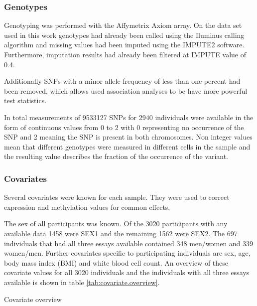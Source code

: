\documentclass[a4paper,12pt]{article}
\begin{document}
 
\subsubsection{Genotypes}
Genotyping was performed with the Affymetrix Axiom array. On the data set used in this work genotypes had already been called using the Iluminus calling algorithm and missing values had been imputed using the IMPUTE2 software\cite{10.1371/journal.pgen.1000529}. Furthermore, imputation results had already been filtered at IMPUTE value of 0.4.  

Additionally SNPs with a minor allele frequency of less than one percent had been removed, which allows used association analyses to be have more powerful test statistics.

In total measurements of 9533127 SNPs for 2940 individuals were available in the form of continuous values from 0 to 2 with 0 representing no occurrence of the SNP and 2 meaning the SNP is present in both chromosomes. Non integer values mean that different genotypes were measured in different cells in the sample and the resulting value describes the fraction of the occurrence of the variant. 

\subsubsection{Covariates}
Several covariates were known for each sample. They were used to correct expression and methylation values for common effects. 

The sex of all participants was known. Of the 3020 participants with any available data 1458 were SEX1 and the remaining 1562 were SEX2. The 697 individuals that had all three essays available contained 348 men/women and 339 women/men.
Further covariates specific to participating individuals are sex, age, body mass index (BMI) and white blood cell count. An overview of these covariate values for all 3020 individuals and the individuals with all three essays available is shown in table \ref{tab:covariate.overview}.


\begin{table}[h!]
  	\begin{minipage}{.45\textwidth}
    \end{minipage}
    \hfill
     \begin{minipage}{.45\linewidth}
    \end{minipage}%
    \caption{Covariate overview}
	\label{tab:covariate.overview}
\end{table}
\end{document}
